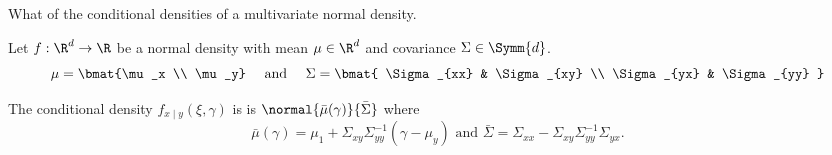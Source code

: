 
What of the conditional densities of a multivariate normal density.


\begin{prop}

Let $f: \R^d \to \R$ be a normal density with mean $\mu \in \R^d$ and covariance $\Sigma \in \Symm{d}$.
\[
  \mu = \bmat{\mu_x \\ \mu_y} \quad \text{ and } \quad
  \Sigma = \bmat{
    \Sigma_{xx} & \Sigma_{xy} \\
    \Sigma_{yx} & \Sigma_{yy}
  }
\]

The conditional density $f_{x \mid y}(\xi, \gamma)$ is is $\normal{\bar{\mu}(\gamma)}{\bar{\Sigma}}$ where
  \[
    \bar{\mu}(\gamma) = \mu_1 + \Sigma_{xy}\Sigma_{yy}^{-1}(\gamma - \mu_y) \text{ and } \bar{\Sigma} = \Sigma_{xx} - \Sigma_{xy}\Sigma_{yy}^{-1}\Sigma_{yx}.
  \]
\end{prop}
\strats
